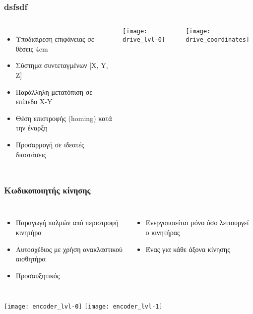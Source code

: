 \documentclass[xetex,mathserif,serif]{beamer}
\begin{document}
\begin{frame}\frametitle
    {dsfsdf}

    \begin{columns}[T]
    \column{5cm}
    \begin{itemize}
    \item Υποδιαίρεση επιφάνειας σε θέσεις 4cm
    \item Σύστημα συντεταγμένων [X, Y, Z]
    \item Παράλληλη μετατόπιση σε επίπεδο X-Y
    \item Θέση επιστροφής (homing) κατά την έναρξη
    \item Προσαρμογή σε ιδεατές διαστάσεις
    \end{itemize}

    \column{6cm}
    \texttt{[image: drive\_lvl-0]}

    \rule{0pt}{0.5cm}

    \texttt{[image: drive\_coordinates]}
    \end{columns}
\end{frame}


\begin{frame}\frametitle%
    {Κωδικοποιητής κίνησης}

    \begin{columns}[t]
    \column{5.5cm}
    \begin{itemize}
        \item Παραγωγή παλμών από περιστροφή κινητήρα
        \item Αυτοσχέδιος με χρήση ανακλαστικού αισθητήρα
        \item Προσαυξητικός
    \end{itemize}

    \column{5.5cm}
    \begin{itemize}
        \item Ενεργοποιείται μόνο όσο λειτουργεί ο κινητήρας
        \item Ένας για κάθε άξονα κίνησης
    \end{itemize}
    \end{columns}

    \begin{columns}
    \column{5.5cm}
    \texttt{[image: encoder\_lvl-0]}
    \column{5.5cm}
    \texttt{[image: encoder\_lvl-1]}
    \end{columns}
\end{frame}

\end{document}
